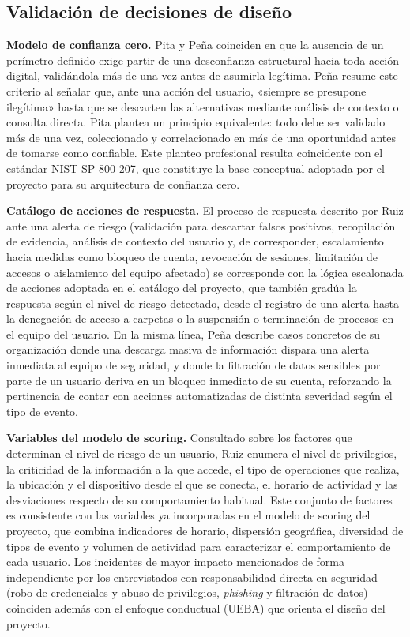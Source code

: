\subsection{Validación de decisiones de diseño}
\label{sec:validacion-diseno}
\textbf{Modelo de confianza cero.} Pita y Peña coinciden en que la ausencia de un perímetro definido exige partir de una desconfianza estructural hacia toda acción digital, validándola más de una vez antes de asumirla legítima. Peña resume este criterio al señalar que, ante una acción del usuario, «siempre se presupone ilegítima» hasta que se descarten las alternativas mediante análisis de contexto o consulta directa. Pita plantea un principio equivalente: todo debe ser validado más de una vez, coleccionado y correlacionado en más de una oportunidad antes de tomarse como confiable. Este planteo profesional resulta coincidente con el estándar NIST SP 800-207, que constituye la base conceptual adoptada por el proyecto para su arquitectura de confianza cero.

\textbf{Catálogo de acciones de respuesta.} El proceso de respuesta descrito por Ruiz ante una alerta de riesgo (validación para descartar falsos positivos, recopilación de evidencia, análisis de contexto del usuario y, de corresponder, escalamiento hacia medidas como bloqueo de cuenta, revocación de sesiones, limitación de accesos o aislamiento del equipo afectado) se corresponde con la lógica escalonada de acciones adoptada en el catálogo del proyecto, que también gradúa la respuesta según el nivel de riesgo detectado, desde el registro de una alerta hasta la denegación de acceso a carpetas o la suspensión o terminación de procesos en el equipo del usuario. En la misma línea, Peña describe casos concretos de su organización donde una descarga masiva de información dispara una alerta inmediata al equipo de seguridad, y donde la filtración de datos sensibles por parte de un usuario deriva en un bloqueo inmediato de su cuenta, reforzando la pertinencia de contar con acciones automatizadas de distinta severidad según el tipo de evento.

\textbf{Variables del modelo de scoring.} Consultado sobre los factores que determinan el nivel de riesgo de un usuario, Ruiz enumera el nivel de privilegios, la criticidad de la información a la que accede, el tipo de operaciones que realiza, la ubicación y el dispositivo desde el que se conecta, el horario de actividad y las desviaciones respecto de su comportamiento habitual. Este conjunto de factores es consistente con las variables ya incorporadas en el modelo de scoring del proyecto, que combina indicadores de horario, dispersión geográfica, diversidad de tipos de evento y volumen de actividad para caracterizar el comportamiento de cada usuario. Los incidentes de mayor impacto mencionados de forma independiente por los entrevistados con responsabilidad directa en seguridad (robo de credenciales y abuso de privilegios, \emph{phishing} y filtración de datos) coinciden además con el enfoque conductual (UEBA) que orienta el diseño del proyecto.

